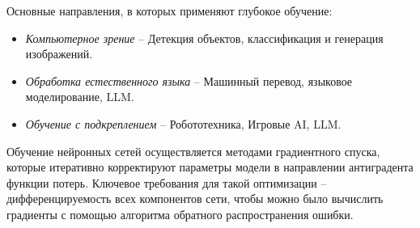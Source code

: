 \documentclass[../part_1.tex]{subfiles}
\begin{document}
\par Основные направления, в которых применяют глубокое обучение:
\begin{itemize}
    \item \textit{Компьютерное зрение} -- Детекция объектов, классификация и генерация изображений.
    \item \textit{Обработка естественного языка} -- Машинный перевод, языковое моделирование, LLM.
    \item \textit{Обучение с подкреплением} -- Робототехника, Игровые AI, LLM.
\end{itemize}
\par Обучение нейронных сетей осуществляется методами градиентного спуска, которые итеративно корректируют параметры модели в направлении антиградента функции потерь. Ключевое требования для такой оптимизации -- дифференцируемость всех компонентов сети, чтобы можно было вычислить градиенты с помощью алгоритма обратного распространения ошибки. 
\end{document}

